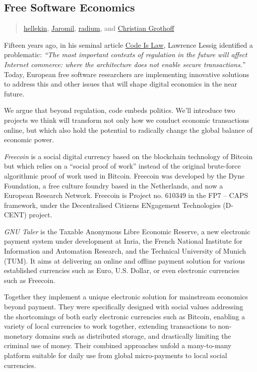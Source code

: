 \subsection{Free Software Economics}\label{free-software-economics}

\begin{quote}
\hyperlink{hellekin}{hellekin},
\hyperlink{jaromil}{Jaromil},
\hyperlink{radium}{radium}, and
\hyperlink{christian-grothoff}{Christian
Grothoff}
\end{quote}

Fifteen years ago, in his seminal article
\href{http://harvardmagazine.com/2000/01/code-is-law-html}{Code Is Law},
Lawrence Lessig identified a problematic: \emph{``The most important
contexts of regulation in the future will affect Internet commerce:
where the architecture does not enable secure transactions.''} Today,
European free software researchers are implementing innovative solutions
to address this and other issues that will shape digital economics in
the near future.

We argue that beyond regulation, code embeds politics. We'll introduce
two projects we think will transform not only how we conduct economic
transactions online, but which also hold the potential to radically
change the global balance of economic power.

\emph{Freecoin} is a social digital currency based on the blockchain
technology of Bitcoin but which relies on a ``social proof of work''
instead of the original brute-force algorithmic proof of work used in
Bitcoin. Freecoin was developed by the Dyne Foundation, a free culture
foundry based in the Netherlands, and now a European Research Network.
Freecoin is Project no. 610349 in the FP7 -- CAPS framework, under the
Decentralised Citizens ENgagement Technologies (D-CENT) project.

\emph{GNU Taler} is the Taxable Anonymous Libre Economic Reserve, a new
electronic payment system under development at Inria, the French
National Institute for Information and Automation Research, and the
Technical University of Munich (TUM). It aims at delivering an online
and offline payment solution for various established currencies such as
Euro, U.S. Dollar, or even electronic currencies such as Freecoin.

Together they implement a unique electronic solution for mainstream
economics beyond payment. They were specifically designed with social
values addressing the shortcomings of both early electronic currencies
such as Bitcoin, enabling a variety of local currencies to work
together, extending transactions to non-monetary domains such as
distributed storage, and drastically limiting the criminal use of money.
Their combined approaches unfold a many-to-many platform suitable for
daily use from global micro-payments to local social currencies.

